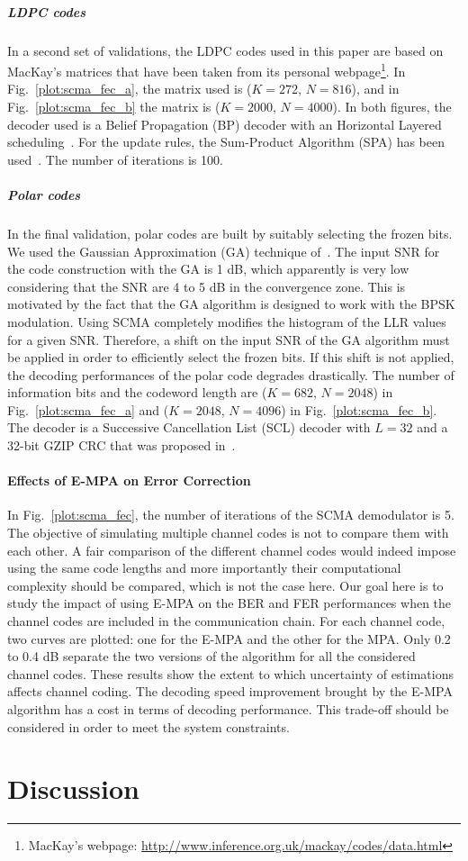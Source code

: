 \subparagraph{LDPC codes}

In a second set of validations, the LDPC codes used in this paper are based on
MacKay's matrices that have been taken from its personal
webpage\footnote{MacKay's webpage: \url{http://www.inference.org.uk/mackay/codes/data.html}}.
In Fig.~\ref{plot:scma_fec_a}, the matrix used is ($K=272$, $N=816$), and in
Fig.~\ref{plot:scma_fec_b} the matrix is ($K=2000$, $N=4000$). In both figures,
the decoder used is a Belief Propagation (BP) decoder with an Horizontal Layered
scheduling~\cite{Yeo2001}. For the update rules, the Sum-Product Algorithm (SPA)
has been used~\cite{MacKay1999}. The number of iterations is 100.

\subparagraph{Polar codes}

In the final validation, polar codes are built by suitably selecting the frozen
bits. We used the Gaussian Approximation (GA) technique of~\cite{Trifonov2012}.
The input SNR for the code construction with the GA is 1 dB, which apparently is
very low considering that the SNR are 4 to 5 dB in the convergence zone. This is
motivated by the fact that the GA algorithm is designed to work with the BPSK
modulation. Using SCMA completely modifies the histogram of the LLR values for a
given SNR. Therefore, a shift on the input SNR of the GA algorithm must be
applied in order to efficiently select the frozen bits. If this shift is
not applied, the decoding performances of the polar code degrades drastically.
The number of information bits and the codeword length are ($K=682$, $N=2048$)
in Fig.~\ref{plot:scma_fec_a} and ($K=2048$, $N=4096$) in
Fig.~\ref{plot:scma_fec_b}. The decoder is a Successive Cancellation List (SCL)
decoder with $L=32$ and a 32-bit GZIP CRC that was proposed
in~\cite{Leonardon2019}.

\paragraph{Effects of E-MPA on Error Correction}
\label{sec:scma_fec_e-mpa}

In Fig.~\ref{plot:scma_fec}, the number of iterations of the SCMA demodulator is
5. The objective of simulating multiple channel codes is not to compare them
with each other. A fair comparison of the different channel codes would indeed
impose using the same code lengths and more importantly their computational
complexity should be compared, which is not the case here. Our goal here is to
study the impact of using E-MPA on the BER and FER performances when the channel
codes are included in the communication chain. For each channel code, two curves
are plotted: one for the E-MPA and the other for the MPA. Only 0.2 to 0.4 dB
separate the two versions of the algorithm for all the considered channel codes.
These results show the extent to which uncertainty of estimations affects
channel coding. The decoding speed improvement brought by the E-MPA algorithm
has a cost in terms of decoding performance. This trade-off should be considered
in order to meet the system constraints.

\section{Discussion}
